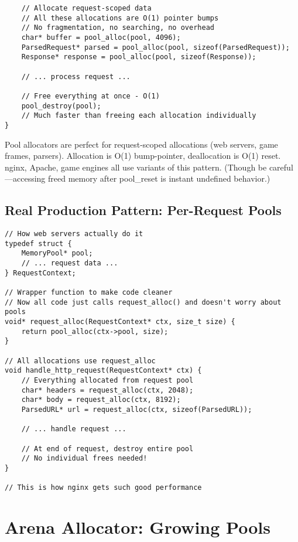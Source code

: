 \begin{lstlisting}
    // Allocate request-scoped data
    // All these allocations are O(1) pointer bumps
    // No fragmentation, no searching, no overhead
    char* buffer = pool_alloc(pool, 4096);
    ParsedRequest* parsed = pool_alloc(pool, sizeof(ParsedRequest));
    Response* response = pool_alloc(pool, sizeof(Response));

    // ... process request ...

    // Free everything at once - O(1)
    pool_destroy(pool);
    // Much faster than freeing each allocation individually
}
\end{lstlisting}

\begin{tipbox}
Pool allocators are perfect for request-scoped allocations (web servers, game frames, parsers). Allocation is O(1) bump-pointer, deallocation is O(1) reset. nginx, Apache, game engines all use variants of this pattern. (Though be careful—accessing freed memory after pool\_reset is instant undefined behavior.)
\end{tipbox}

\subsection{Real Production Pattern: Per-Request Pools}

\begin{lstlisting}
// How web servers actually do it
typedef struct {
    MemoryPool* pool;
    // ... request data ...
} RequestContext;

// Wrapper function to make code cleaner
// Now all code just calls request_alloc() and doesn't worry about pools
void* request_alloc(RequestContext* ctx, size_t size) {
    return pool_alloc(ctx->pool, size);
}

// All allocations use request_alloc
void handle_http_request(RequestContext* ctx) {
    // Everything allocated from request pool
    char* headers = request_alloc(ctx, 2048);
    char* body = request_alloc(ctx, 8192);
    ParsedURL* url = request_alloc(ctx, sizeof(ParsedURL));

    // ... handle request ...

    // At end of request, destroy entire pool
    // No individual frees needed!
}

// This is how nginx gets such good performance
\end{lstlisting}

\section{Arena Allocator: Growing Pools}

